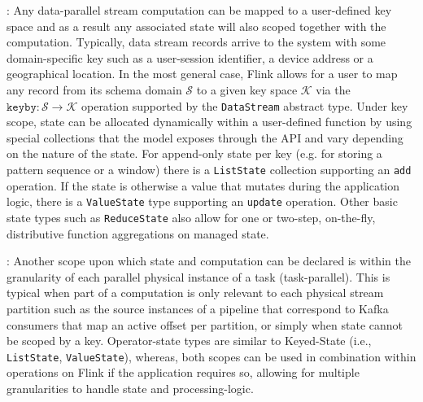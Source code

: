 : Any data-parallel stream computation can be mapped to a user-defined key space and as a result any associated state will also scoped together with the computation. Typically, data stream records arrive to the system with some domain-specific key such as a user-session identifier, a device address or a geographical location. In the most general case, Flink allows for a user to map any record from its schema domain $\mathcal{S}$ to a given key space $\mathcal{K}$ via the $\texttt{keyby}: \mathcal{S} \rightarrow \mathcal{K}$ operation supported by the \texttt{DataStream} abstract type. Under key scope, state can be allocated dynamically within a user-defined function by using special collections that the model exposes through the API and vary depending on the nature of the state. For append-only state per key (e.g. for storing a pattern sequence or a window) there is a \texttt{ListState} collection supporting an \texttt{add} operation. If  the state is otherwise a value that mutates during the application logic, there is a \texttt{ValueState} type supporting an \texttt{update} operation. Other basic state types such as \texttt{ReduceState} also allow for one or two-step, on-the-fly, distributive function aggregations on managed state. 

: Another scope upon which state and computation can be declared is within the granularity of each parallel physical instance of a task (task-parallel). This is typical when part of a computation is only relevant to each physical stream partition such as the source instances of a pipeline that correspond to Kafka consumers that map an active offset per partition, or simply when state cannot be scoped by a key. Operator-state types are similar to Keyed-State (i.e., \texttt{ListState}, \texttt{ValueState}), whereas, both scopes can be used in combination within operations on Flink if the application requires so, allowing for multiple granularities to handle state and processing-logic. 

